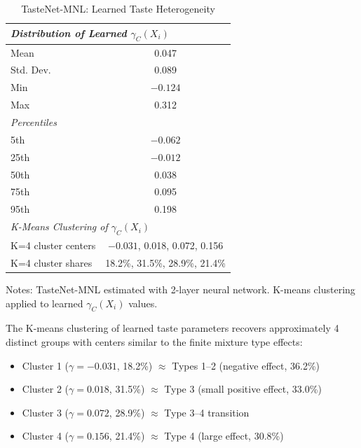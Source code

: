 \documentclass[12pt]{article}
\begin{document}
\begin{table}[H]
\centering
\caption{TasteNet-MNL: Learned Taste Heterogeneity}
\label{tab:tastenet}
\begin{threeparttable}
\begin{tabular}{lc}
\toprule
\multicolumn{2}{l}{\textit{Distribution of Learned $\gamma_C(X_i)$}} \\
\midrule
Mean & 0.047 \\
Std. Dev. & 0.089 \\
Min & $-0.124$ \\
Max & 0.312 \\
\midrule
\multicolumn{2}{l}{\textit{Percentiles}} \\
5th & $-0.062$ \\
25th & $-0.012$ \\
50th & 0.038 \\
75th & 0.095 \\
95th & 0.198 \\
\midrule
\multicolumn{2}{l}{\textit{K-Means Clustering of $\gamma_C(X_i)$}} \\
K=4 cluster centers & $-0.031$, 0.018, 0.072, 0.156 \\
K=4 cluster shares & 18.2\%, 31.5\%, 28.9\%, 21.4\% \\
\bottomrule
\end{tabular}
\begin{tablenotes}
\small
\item Notes: TasteNet-MNL estimated with 2-layer neural network. K-means clustering applied to learned $\gamma_C(X_i)$ values.
\end{tablenotes}
\end{threeparttable}
\end{table}

The K-means clustering of learned taste parameters recovers approximately 4 distinct groups with centers similar to the finite mixture type effects:
\begin{itemize}
    \item Cluster 1 ($\gamma = -0.031$, 18.2\%) $\approx$ Types 1--2 (negative effect, 36.2\%)
    \item Cluster 2 ($\gamma = 0.018$, 31.5\%) $\approx$ Type 3 (small positive effect, 33.0\%)
    \item Cluster 3 ($\gamma = 0.072$, 28.9\%) $\approx$ Type 3--4 transition
    \item Cluster 4 ($\gamma = 0.156$, 21.4\%) $\approx$ Type 4 (large effect, 30.8\%)
\end{itemize}
\end{document}
